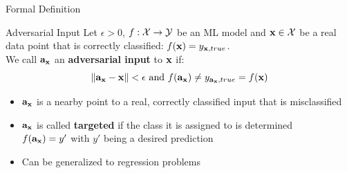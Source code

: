 \documentclass[10pt,compress,t,notes=noshow, xcolor=table]{beamer}
\begin{document}
\begin{frame}[c]{Formal Definition}
\begin{block}{Adversarial Input}
Let $\epsilon>0$, $f:\mathcal{X} \rightarrow \mathcal{Y}$ be an ML model and $\mathbf{x} \in \mathcal{X}$ be a real data point that is correctly classified: $f(\mathbf{x})=y_{\mathbf{x},true}$. \\\medskip
 We call $\mathbf{a}_{\mathbf{x}}$ an \textbf{adversarial input} to $\mathbf{x}$ if:
\begin{equation*}
    \| \mathbf{a}_{\mathbf{x}}- \mathbf{x}\|<\epsilon\text{ and } f(\mathbf{a}_{\mathbf{x}})\neq y_{\mathbf{a}_{\mathbf{x}},true}=f(\mathbf{x})
\end{equation*}
\end{block}
\begin{itemize}
    \item $\mathbf{a}_{\mathbf{x}}$ is a nearby point to a real, correctly classified input that is misclassified
    \item $\mathbf{a}_{\mathbf{x}}$ is called \textbf{targeted} if the class it is assigned to is determined\\
    $f(\mathbf{a}_{\mathbf{x}})=y'$ with $y'$ being a desired prediction
    \item Can be generalized to regression problems
\end{itemize}
\end{frame}


\end{document}
